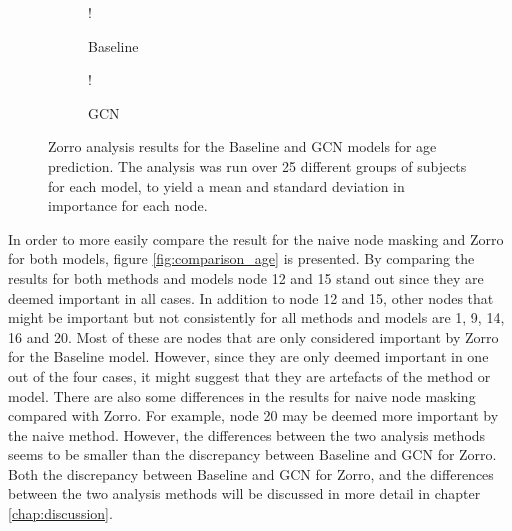 \begin{figure}[H]
    \centering
        \begin{subfigure}{.5\textwidth}
            \centering
            \begin{center}
                \resizebox {1.0\linewidth} {!} {
                    
                }
            \end{center}
            \caption{Baseline}
            \label{fig:zorro_age_baseline}
        \end{subfigure}%
        \begin{subfigure}{.5\textwidth}
            \centering
            \begin{center}
                \resizebox {1.0\linewidth} {!} {
                    
                }
            \end{center}
            \caption{GCN}
            \label{fig:zorro_age_gcn}
        \end{subfigure}
    \caption{Zorro analysis results for the Baseline and GCN models for age prediction. The analysis was run over 25 different groups of subjects for each model, to yield a mean and standard deviation in importance for each node.}
    \label{fig:zorro_age}
\end{figure}


In order to more easily compare the result for the naive node masking and Zorro for both models, figure \ref{fig:comparison_age} is presented. By comparing the results for both methods and models node 12 and 15 stand out since they are deemed important in all cases. In addition to node 12 and 15, other nodes that might be important but not consistently for all methods and models are 1, 9, 14, 16 and 20. Most of these are nodes that are only considered important by Zorro for the Baseline model. However, since they are only deemed important in one out of the four cases, it might suggest that they are artefacts of the method or model.
There are also some differences in the results for naive node masking compared with Zorro. For example, node 20 may be deemed more important by the naive method. However, the differences between the two analysis methods seems to be smaller than the discrepancy between Baseline and GCN for Zorro. Both the discrepancy between Baseline and GCN for Zorro, and the differences between the two analysis methods will be discussed in more detail in chapter \ref{chap:discussion}.


